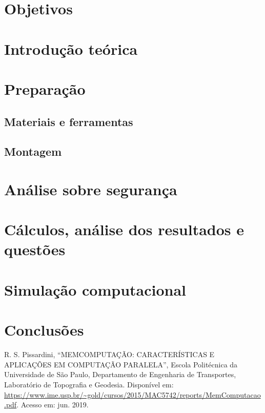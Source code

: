 \documentclass[a4paper,12pt,oneside,openany,table,xcdraw]{article}
\begin{document}
\newcommand{\thedepartment}{Faculdade de Engenharia Elétrica}
\newcommand{\thecourse}{FEELT}
\newcommand{\thetitle}{CIRCUITOS ACOPLADOS MAGNETICAMENTE}
\newcommand{\thetype}{Relatório da Disciplina de Circuitos Elétricos II}
\newcommand{\theproftitle}{Bacharel em Engenharia Elétrica}
\newcommand{\thestudent}{Lesly Viviane Montúfar Berrios\\
\centering11811ETE001}
\newcommand{\theadvisor}{Prof. Wellington Maycon Santos Bernardes}
\newcommand{\thecity}{Uberlândia}

\thispagestyle{empty}


\onehalfspacing
\tableofcontents %
\newpage

\section{Objetivos} %

\section{Introdução teórica} %

\section{Preparação}
\subsection{Materiais e ferramentas} %
\subsection{Montagem} %

\section{Análise sobre segurança} %
\section{Cálculos, análise dos resultados e questões} %
\section{Simulação computacional} %
\section{Conclusões} %



\newpage
\begin{thebibliography}{9} 
    R. S. Pissardini,
    “MEMCOMPUTAÇÃO: CARACTERÍSTICAS E APLICAÇÕES EM
COMPUTAÇÃO PARALELA”, Escola Politécnica da Universidade de São Paulo, Departamento de Engenharia de Transportes, Laboratório de Topografia e Geodesia.
 Disponível em:
 \url{https://www.ime.usp.br/~gold/cursos/2015/MAC5742/reports/MemComputacao.pdf}. Acesso em: jun. 2019.




\end{thebibliography}
\end{document}
